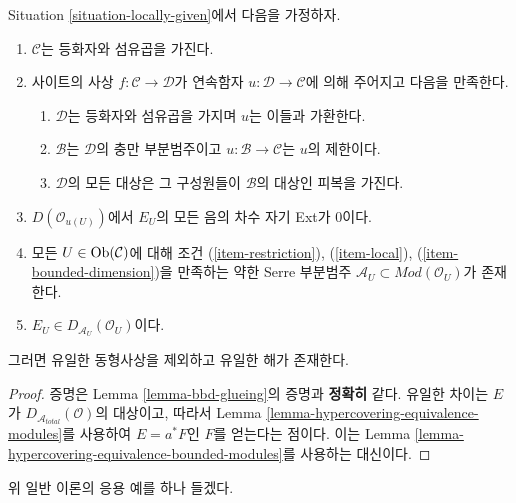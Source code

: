 \begin{lemma}
\label{lemma-bbd-unbounded-glueing}
Situation \ref{situation-locally-given}에서 다음을 가정하자.
\begin{enumerate}
\item $\mathcal{C}$는 등화자와 섬유곱을 가진다.
\item 사이트의 사상 $f : \mathcal{C} \to \mathcal{D}$가 연속함자
$u : \mathcal{D} \to \mathcal{C}$에 의해 주어지고 다음을 만족한다.
\begin{enumerate}
\item $\mathcal{D}$는 등화자와 섬유곱을 가지며 $u$는 이들과 가환한다.
\item $\mathcal{B}$는 $\mathcal{D}$의 충만 부분범주이고
$u : \mathcal{B} \to \mathcal{C}$는 $u$의 제한이다.
\item $\mathcal{D}$의 모든 대상은 그 구성원들이 $\mathcal{B}$의 대상인
피복을 가진다.
\end{enumerate}
\item $D(\mathcal{O}_{u(U)})$에서 $E_U$의 모든 음의 차수 자기 Ext가 0이다.
\item 모든 $U \in \mathop{\mathrm{Ob}}\nolimits(\mathcal{C})$에 대해 조건
(\ref{item-restriction}), (\ref{item-local}),
(\ref{item-bounded-dimension})을 만족하는 약한 Serre 부분범주
$\mathcal{A}_U \subset \textit{Mod}(\mathcal{O}_U)$가 존재한다.
\item $E_U \in D_{\mathcal{A}_U}(\mathcal{O}_U)$이다.
\end{enumerate}
그러면 유일한 동형사상을 제외하고 유일한 해가 존재한다.
\end{lemma}

\begin{proof}
증명은 Lemma \ref{lemma-bbd-glueing}의 증명과 {\bf 정확히} 같다.
유일한 차이는 $E$가 $D_{\mathcal{A}_{total}}(\mathcal{O})$의 대상이고,
따라서 Lemma \ref{lemma-hypercovering-equivalence-modules}를 사용하여
$E = a^*F$인 $F$를 얻는다는 점이다. 이는 Lemma
\ref{lemma-hypercovering-equivalence-bounded-modules}를 사용하는 대신이다.
\end{proof}

\noindent
위 일반 이론의 응용 예를 하나 들겠다.

